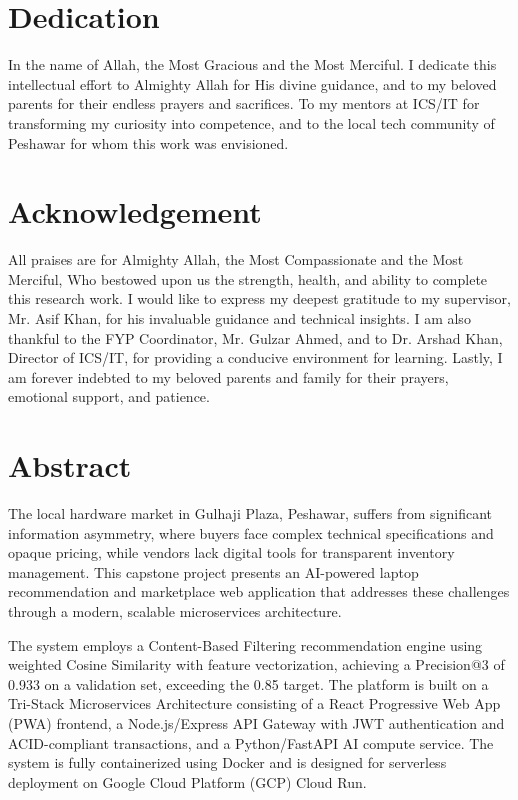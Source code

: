 \documentclass[12pt,a4paper,oneside]{report}
\begin{document}


\chapter*{Dedication}
In the name of Allah, the Most Gracious and the Most Merciful. I dedicate this
intellectual effort to Almighty Allah for His divine guidance, and to my beloved
parents for their endless prayers and sacrifices. To my mentors at ICS/IT for
transforming my curiosity into competence, and to the local tech community of
Peshawar for whom this work was envisioned.

\chapter*{Acknowledgement}
All praises are for Almighty Allah, the Most Compassionate and the Most Merciful,
Who bestowed upon us the strength, health, and ability to complete this research
work. I would like to express my deepest gratitude to my supervisor, Mr. Asif Khan,
for his invaluable guidance and technical insights. I am also thankful to the FYP
Coordinator, Mr. Gulzar Ahmed, and to Dr. Arshad Khan, Director of ICS/IT, for
providing a conducive environment for learning. Lastly, I am forever indebted to
my beloved parents and family for their prayers, emotional support, and patience.

\chapter*{Abstract}
The local hardware market in Gulhaji Plaza, Peshawar, suffers from significant
information asymmetry, where buyers face complex technical specifications and
opaque pricing, while vendors lack digital tools for transparent inventory
management. This capstone project presents an AI-powered laptop recommendation
and marketplace web application that addresses these challenges through a modern,
scalable microservices architecture.

The system employs a Content-Based Filtering recommendation engine using weighted
Cosine Similarity with feature vectorization, achieving a Precision@3 of 0.933 on
a validation set, exceeding the 0.85 target. The platform is built on a Tri-Stack
Microservices Architecture consisting of a React Progressive Web App (PWA)
frontend, a Node.js/Express API Gateway with JWT authentication and ACID-compliant
transactions, and a Python/FastAPI AI compute service. The system is fully
containerized using Docker and is designed for serverless deployment on Google
Cloud Platform (GCP) Cloud Run.
\end{document}

